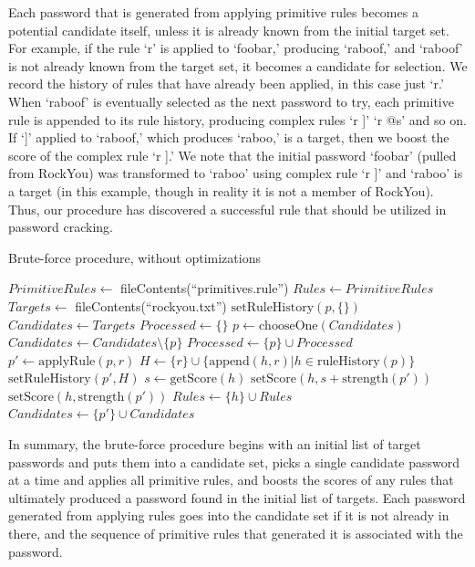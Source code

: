 \documentclass[letterpaper,twocolumn,10pt]{article}
\begin{document}
Each password that is generated from applying primitive rules becomes a
potential candidate itself, unless it is already known from the initial target
set. For example, if the rule `r' is applied to `foobar,' producing `raboof,'
and `raboof' is not already known from the target set, it becomes a candidate
for selection. We record the history of rules that have already been applied, in
this case just `r.' When `raboof' is eventually selected as the next password to
try, each primitive rule is appended to its rule history, producing complex
rules `r ]' `r @s' and so on. If `]' applied to `raboof,' which produces
`raboo,' is a target, then we boost the score of the complex rule `r ].' We note
that the initial password `foobar' (pulled from RockYou) was transformed to
`raboo' using complex rule `r ]' and `raboo' is a target (in this example,
though in reality it is not a member of RockYou). Thus, our procedure has
discovered a successful rule that should be utilized in password cracking.

\begin{algorithm}\caption{Brute-force procedure, without optimizations}
\begin{algorithmic}[1]
\State $PrimitiveRules \gets $ fileContents(``primitives.rule'')
\State $Rules \gets PrimitiveRules$
\State $Targets \gets $ fileContents(``rockyou.txt'')
  \State $\mathrm{setRuleHistory}(p, \{\})$
\EndFor
\State $Candidates \gets Targets$
\State $Processed \gets \{\}$
  \State $p \gets \mathrm{chooseOne}(Candidates)$
  \State $Candidates \gets Candidates \setminus \{p\}$
  \State $Processed \gets \{p\} \cup Processed$
    \State $p' \gets \mathrm{applyRule}(p, r)$
    \State $H \gets \{r\}\cup\{\mathrm{append}(h, r)|h \in
\mathrm{ruleHistory}(p)\}$
    \State $\mathrm{setRuleHistory}(p', H)$
          \State $s \gets \mathrm{getScore}(h)$
          \State $\mathrm{setScore}(h,
s+\mathrm{strength}(p'))$
        \Else
          \State $\mathrm{setScore}(h, \mathrm{strength}(p'))$
          \State $Rules \gets \{h\}\cup Rules$
        \EndIf
      \EndFor
    \EndIf
      \State $Candidates \gets \{p'\}\cup Candidates$
    \EndIf
  \EndFor
\EndWhile
\end{algorithmic}
\label{alg:brute-force}
\end{algorithm}

In summary, the brute-force procedure begins with an initial list of target
passwords and puts them into a candidate set, picks a single candidate password
at a time and applies all primitive rules, and boosts the scores of any rules
that ultimately produced a password found in the initial list of targets. Each
password generated from applying rules goes into the candidate set if it is not
already in there, and the sequence of primitive rules that generated it is
associated with the password.
\end{document}
